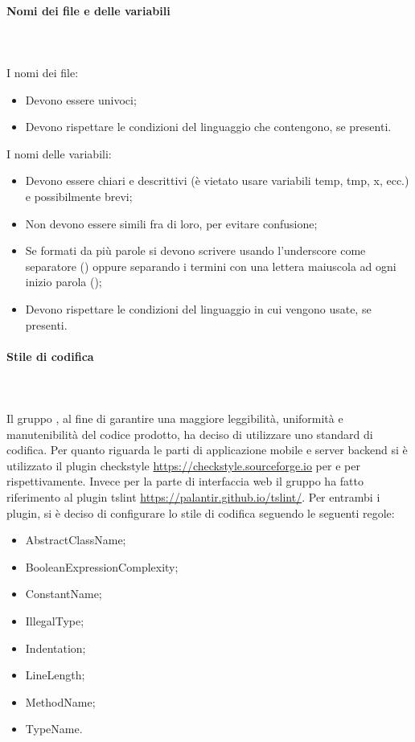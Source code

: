 \paragraph{Nomi dei file e delle variabili}\mbox{}\\ \\
I nomi dei file:
\begin{itemize}
    \item Devono essere univoci;
    \item Devono rispettare le condizioni del linguaggio che contengono, se presenti.
\end{itemize}
I nomi delle variabili:
\begin{itemize}
    \item Devono essere chiari e descrittivi (è vietato usare variabili temp, tmp, x, ecc.) e possibilmente brevi;
    \item Non devono essere simili fra di loro, per evitare confusione;
    \item Se formati da più parole si devono scrivere usando l'underscore come separatore () oppure separando i termini con una lettera maiuscola ad ogni inizio parola ();
    \item Devono rispettare le condizioni del linguaggio in cui vengono usate, se presenti.
\end{itemize}

\paragraph{Stile di codifica}\mbox{}\\ \\
Il gruppo \Gruppo{}, al fine di garantire una maggiore leggibilità, uniformità e manutenibilità del codice prodotto, ha deciso di utilizzare uno standard di codifica. Per quanto riguarda le parti di applicazione mobile e server backend si è utilizzato il plugin checkstyle \href{https://checkstyle.sourceforge.io}{https://checkstyle.sourceforge.io} per  e per  rispettivamente. Invece per la parte di interfaccia web il gruppo ha fatto riferimento al plugin tslint \href{https://palantir.github.io/tslint/}{https://palantir.github.io/tslint/}. 
Per entrambi i plugin, si è deciso di configurare lo stile di codifica seguendo le seguenti regole:
\begin{itemize}
	\item AbstractClassName;
	\item BooleanExpressionComplexity;
	\item ConstantName;
	\item IllegalType;
	\item Indentation;
	\item LineLength;
	\item MethodName;
	\item TypeName.
\end{itemize}

